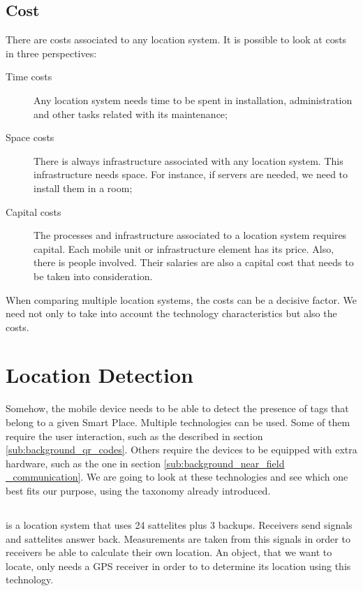 \subsection{Cost}
\label{sub:background_cost}
There are costs associated to any location system.
It is possible to look at costs in three perspectives:
\begin{description}
  \item[Time costs] Any location system needs time to be spent in installation, administration and other tasks related with its maintenance;
  \item[Space costs] There is always infrastructure associated with any location system. This infrastructure needs space. For instance, if servers are needed, we need to install them in a room;
  \item[Capital costs] The processes and infrastructure associated to a location system requires capital.
  Each mobile unit or infrastructure element has its price. Also, there is people involved. Their salaries are also a capital cost that needs to be taken into consideration.
\end{description}

When comparing multiple location systems, the costs can be a decisive factor. We need not only to take into account the technology characteristics but also the costs.

\section{Location Detection}
\label{sec:background_technologies}
Somehow, the mobile device needs to be able to detect the presence of tags that belong to a given Smart Place.
Multiple technologies can be used.
Some of them require the user interaction, such as the described in section \ref{sub:background_qr_codes}.
Others require the devices to be equipped with extra hardware, such as the one in section \ref{sub:background_near_field _communication}.
We are going to look at these technologies and see which one best fits our purpose, using the taxonomy already introduced.

\subsection{}
\label{sub:background_gps}
\cite{gps} is a location system that uses 24 sattelites plus 3 backups.
Receivers send signals and sattelites answer back. Measurements are taken from this signals in order to receivers be able to calculate their own location.
An object, that we want to locate, only needs a \gls{GPS} receiver in order to to determine its location using this technology.

